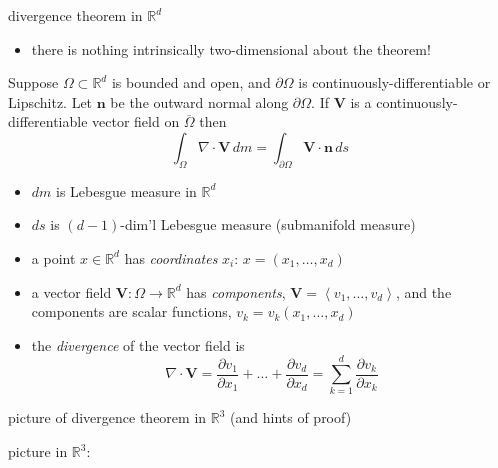 \documentclass[10pt,
               svgnames,
               hyperref={colorlinks,
                         citecolor=DeepPink4,
                         linkcolor=FireBrick,
                         urlcolor=blue},
               usepdftitle=false]{beamer}
\newcommand{\bn}{\mathbf{n}}
\newcommand{\bV}{\mathbf{V}}
\newcommand{\RR}{\mathbb{R}}
\newcommand{\Div}{\nabla\cdot}
\begin{document}
\begin{frame}{divergence theorem in $\RR^d$}

\begin{itemize}
\item there is nothing intrinsically two-dimensional about the theorem!
\end{itemize}

\begin{theorem}
Suppose $\Omega\subset\RR^d$ is bounded and open, and $\partial \Omega$ is continuously-differentiable or Lipschitz.  Let $\bn$ be the outward normal along $\partial \Omega$.  If $\bV$ is a continuously-differentiable vector field on $\overline{\Omega}$ then
	$$\int_\Omega \Div \bV\,dm = \int_{\partial\Omega} \bV\cdot \bn\,ds$$
\end{theorem}

\begin{itemize}
\item<2> $dm$ is Lebesgue measure in $\RR^d$
\item<2> $ds$ is $(d-1)$-dim'l Lebesgue measure (submanifold measure)
\item<2> a point $x\in\RR^d$ has \emph{coordinates} $x_i$: \quad $x = (x_1,\dots,x_d)$
\item<2> a vector field $\bV:\Omega \to \RR^d$ has \emph{components}, $\bV = \left<v_1,\dots,v_d\right>$, and the components are scalar functions, $v_k = v_k(x_1,\dots,x_d)$
\item<2> the \emph{divergence} of the vector field is
	$$\Div \bV = \frac{\partial v_1}{\partial x_1} + \dots + \frac{\partial v_d}{\partial x_d} = \sum_{k=1}^d \frac{\partial v_k}{\partial x_k}$$
\end{itemize}
\end{frame}


\begin{frame}{picture of divergence theorem in $\RR^3$ (and hints of proof)}

picture in $\RR^3$:

\vspace{70mm}
\end{frame}
\end{document}
